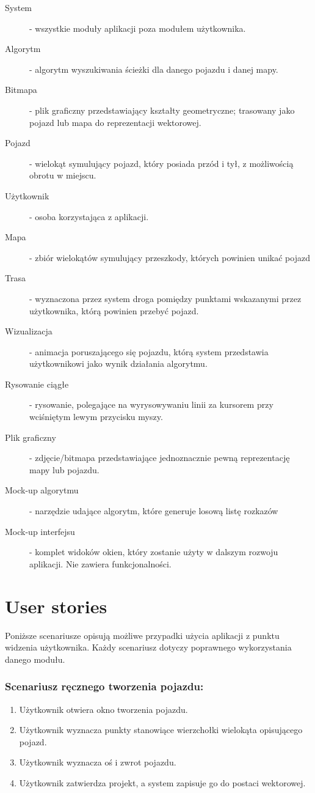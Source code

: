 \documentclass{article}
\let\oldsection\section
\renewcommand\section{\clearpage\oldsection} %
\begin{document}
\begin{description}
  \item[System] - wszystkie moduły aplikacji poza modułem użytkownika.
  \item[Algorytm] - algorytm wyszukiwania ścieżki dla danego pojazdu i danej mapy.
  \item[Bitmapa] - plik graficzny przedstawiający kształty geometryczne; trasowany jako pojazd lub mapa do reprezentacji wektorowej.
  \item[Pojazd] - wielokąt symulujący pojazd, który posiada przód i tył, z możliwością obrotu w miejscu.
  \item[Użytkownik] - osoba korzystająca z aplikacji.
  \item[Mapa] - zbiór wielokątów symulujący przeszkody, których powinien unikać pojazd
  \item[Trasa] - wyznaczona przez system droga pomiędzy punktami wskazanymi przez użytkownika, którą powinien przebyć pojazd.
  \item[Wizualizacja] - animacja poruszającego się pojazdu, którą system przedstawia użytkownikowi jako wynik działania algorytmu.
  \item[Rysowanie ciągłe] - rysowanie, polegające na wyrysowywaniu linii za kursorem przy wciśniętym lewym przycisku myszy.
  \item[Plik graficzny] - zdjęcie/bitmapa przedstawiające jednoznacznie pewną reprezentację mapy lub pojazdu.
  \item[Mock-up algorytmu] - narzędzie udające algorytm, które generuje losową listę rozkazów
  \item[Mock-up interfejsu] - komplet widoków okien, który zostanie użyty w dalszym rozwoju aplikacji. Nie zawiera funkcjonalności.
\end{description}

\section{User stories}

Poniższe scenariusze opisują możliwe przypadki użycia aplikacji z punktu widzenia użytkownika. Każdy scenariusz dotyczy poprawnego wykorzystania danego modułu.

\subsubsection{Scenariusz ręcznego tworzenia pojazdu:}
\begin{enumerate}
  \item Użytkownik otwiera okno tworzenia pojazdu.
  \item Użytkownik wyznacza punkty stanowiące wierzchołki wielokąta opisującego pojazd.
  \item Użytkownik wyznacza oś i zwrot pojazdu.
  \item Użytkownik zatwierdza projekt, a system zapisuje go do postaci wektorowej.
\end{enumerate}
\end{document}
